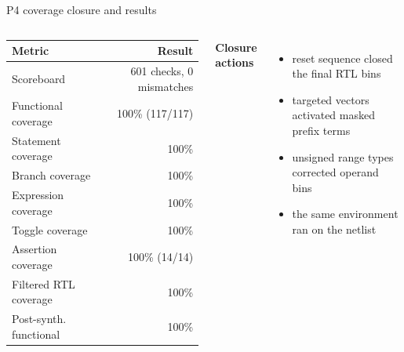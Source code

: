 \documentclass[aspectratio=169,11pt]{beamer}
\newcommand{\key}[1]{{\color{teal}\bfseries #1}}
\begin{document}
\begin{frame}{P4 coverage closure and results}
\begin{columns}[T,onlytextwidth]
\small
\begin{tabularx}{\textwidth}{@{}Yr@{}}
\toprule
\textbf{Metric} & \textbf{Result} \\
\midrule
Scoreboard & 601 checks, 0 mismatches \\
Functional coverage & 100\% (117/117) \\
Statement coverage & 100\% \\
Branch coverage & 100\% \\
Expression coverage & 100\% \\
Toggle coverage & 100\% \\
Assertion coverage & 100\% (14/14) \\
Filtered RTL coverage & 100\% \\
Post-synth. functional & 100\% \\
\bottomrule
\end{tabularx}
\key{Closure actions}\par\vspace{0.4em}
\begin{itemize}
  \item reset sequence closed the final RTL bins
  \item targeted vectors activated masked prefix terms
  \item unsigned range types corrected operand bins
  \item the same environment ran on the netlist
\end{itemize}
\end{columns}
\end{frame}
\end{document}
